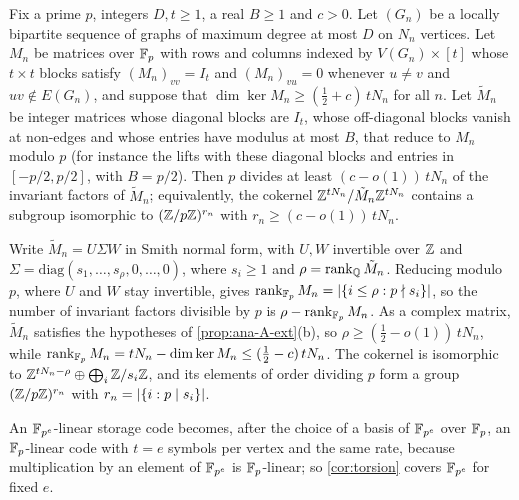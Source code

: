 \begin{corollary}\label{cor:torsion}
\notformalized
Fix a prime $p$, integers $D,t\ge1$, a real $B\ge1$ and $c>0$. Let $(G_n)$ be a locally bipartite sequence of graphs
of maximum degree at most $D$ on $N_n$ vertices. Let $M_n$ be matrices over $\mathbb{F}_p$ with rows and columns indexed by
$V(G_n)\times[t]$ whose $t\times t$ blocks satisfy $(M_n)_{vv}=I_t$ and $(M_n)_{vu}=0$ whenever $u\ne v$ and
$uv\notin E(G_n)$, and suppose that $\dim\ker M_n\ge(\frac12+c)\,tN_n$ for all $n$. Let $\tilde M_n$ be integer
matrices whose diagonal blocks are $I_t$, whose off-diagonal blocks vanish at non-edges and whose entries have modulus at
most $B$, that reduce to $M_n$ modulo $p$ (for instance the lifts with these diagonal blocks and entries in $[-p/2,p/2]$,
with $B=p/2$). Then $p$ divides at least $(c-o(1))\,tN_n$ of the invariant
factors of $\tilde M_n$; equivalently, the cokernel $\mathbb{Z}^{tN_n}/\tilde M_n\mathbb{Z}^{tN_n}$ contains a subgroup isomorphic to
$(\mathbb{Z}/p\mathbb{Z})^{r_n}$ with $r_n\ge(c-o(1))\,tN_n$.
\end{corollary}

\begin{informalproof}
Write $\tilde M_n=U\Sigma W$ in Smith normal form, with $U,W$ invertible over $\mathbb{Z}$ and
$\Sigma=\mathrm{diag}(s_1,\dots,s_\rho,0,\dots,0)$, where $s_i\ge1$ and $\rho=\operatorname{rank}_{\mathbb{Q}}\tilde M_n$. Reducing modulo $p$,
where $U$ and $W$ stay invertible, gives $\operatorname{rank}_{\mathbb{F}_p}M_n=\lvert \{i\le\rho:p\nmid s_i\} \rvert$, so the number of invariant
factors divisible by $p$ is $\rho-\operatorname{rank}_{\mathbb{F}_p}M_n$. As a complex matrix, $\tilde M_n$ satisfies the hypotheses of
\cref{prop:ana-A-ext}(b), so $\rho\ge(\frac12-o(1))\,tN_n$, while $\operatorname{rank}_{\mathbb{F}_p}M_n=tN_n-\dim\ker M_n\le(\frac12-c)\,tN_n$.
The cokernel is isomorphic to $\mathbb{Z}^{tN_n-\rho}\oplus\bigoplus_i\mathbb{Z}/s_i\mathbb{Z}$, and its elements of order dividing $p$ form a
group $(\mathbb{Z}/p\mathbb{Z})^{r_n}$ with $r_n=\lvert \{i:p\mid s_i\} \rvert$.
\end{informalproof}

An $\mathbb{F}_{p^e}$-linear storage code becomes, after the choice of a basis of $\mathbb{F}_{p^e}$ over $\mathbb{F}_p$, an $\mathbb{F}_p$-linear code
with $t=e$ symbols per vertex and the same rate, because multiplication by an element of $\mathbb{F}_{p^e}$ is $\mathbb{F}_p$-linear; so
\cref{cor:torsion} covers $\mathbb{F}_{p^e}$ for fixed $e$.

